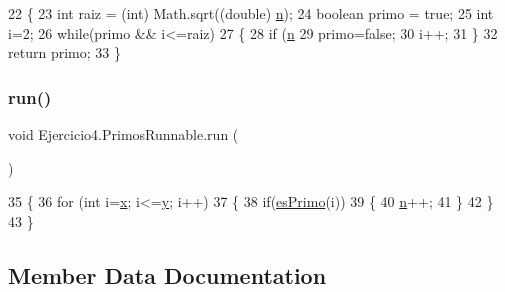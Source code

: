 \begin{DoxyCode}
22                                   \{
23         \textcolor{keywordtype}{int} raiz = (int) Math.sqrt((\textcolor{keywordtype}{double}) \mbox{\hyperlink{class_ejercicio4_1_1_primos_runnable_a891fd5a28f4e81d096573d60d73a27dc}{n}});
24         \textcolor{keywordtype}{boolean} primo = \textcolor{keyword}{true};
25         \textcolor{keywordtype}{int} i=2;
26         \textcolor{keywordflow}{while}(primo && i<=raiz)
27         \{
28             \textcolor{keywordflow}{if} (\mbox{\hyperlink{class_ejercicio4_1_1_primos_runnable_a891fd5a28f4e81d096573d60d73a27dc}{n}} %
29                 primo=\textcolor{keyword}{false};
30             i++;
31         \}
32         \textcolor{keywordflow}{return} primo;
33     \}
\end{DoxyCode}
\mbox{\label{class_ejercicio4_1_1_primos_runnable_a8ea90c000de70dc0f10084003cf6716f}} 
\subsubsection{\texorpdfstring{run()}{run()}}
{\footnotesize\ttfamily void Ejercicio4.\+Primos\+Runnable.\+run (\begin{DoxyParamCaption}{ }\end{DoxyParamCaption})\hspace{0.3cm}{\ttfamily [inline]}}


\begin{DoxyCode}
35                      \{
36         \textcolor{keywordflow}{for} (\textcolor{keywordtype}{int} i=\mbox{\hyperlink{class_ejercicio4_1_1_primos_runnable_a6247d4ce772969a27b7c821a3c22f5c7}{x}}; i<=\mbox{\hyperlink{class_ejercicio4_1_1_primos_runnable_af8c0c9f26577ea851dfb80040571a4f3}{y}}; i++)
37         \{
38             \textcolor{keywordflow}{if}(\mbox{\hyperlink{class_ejercicio4_1_1_primos_runnable_a613d7d8583b20db4b1cd1c23f545aa56}{esPrimo}}(i))
39             \{
40                 \mbox{\hyperlink{class_ejercicio4_1_1_primos_runnable_a891fd5a28f4e81d096573d60d73a27dc}{n}}++;
41             \}
42         \}
43     \}
\end{DoxyCode}


\subsection{Member Data Documentation}
\mbox{\label{class_ejercicio4_1_1_primos_runnable_a891fd5a28f4e81d096573d60d73a27dc}} 
